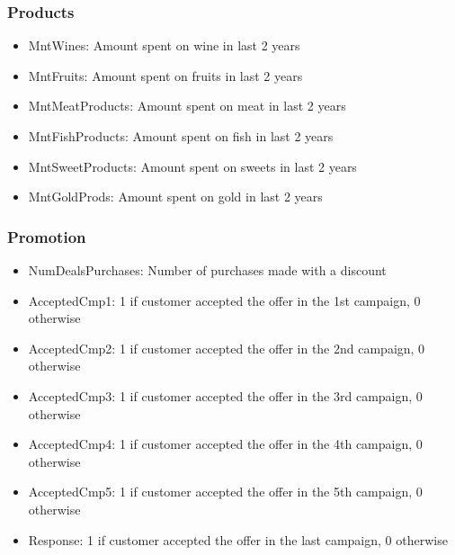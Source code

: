 \documentclass[letterpaper,11pt]{article}
\begin{document}
\subsubsection*{Products}
\begin{itemize}
\item MntWines: Amount spent on wine in last 2 years
\item MntFruits: Amount spent on fruits in last 2 years
\item MntMeatProducts: Amount spent on meat in last 2 years
\item MntFishProducts: Amount spent on fish in last 2 years
\item MntSweetProducts: Amount spent on sweets in last 2 years
\item MntGoldProds: Amount spent on gold in last 2 years
\end{itemize}

\subsubsection*{Promotion}
\begin{itemize}
\item NumDealsPurchases: Number of purchases made with a discount
\item AcceptedCmp1: 1 if customer accepted the offer in the 1st campaign, 0 otherwise
\item AcceptedCmp2: 1 if customer accepted the offer in the 2nd campaign, 0 otherwise
\item AcceptedCmp3: 1 if customer accepted the offer in the 3rd campaign, 0 otherwise
\item AcceptedCmp4: 1 if customer accepted the offer in the 4th campaign, 0 otherwise
\item AcceptedCmp5: 1 if customer accepted the offer in the 5th campaign, 0 otherwise
 \item Response: 1 if customer accepted the offer in the last campaign, 0 otherwise
\end{itemize}
\end{document}
